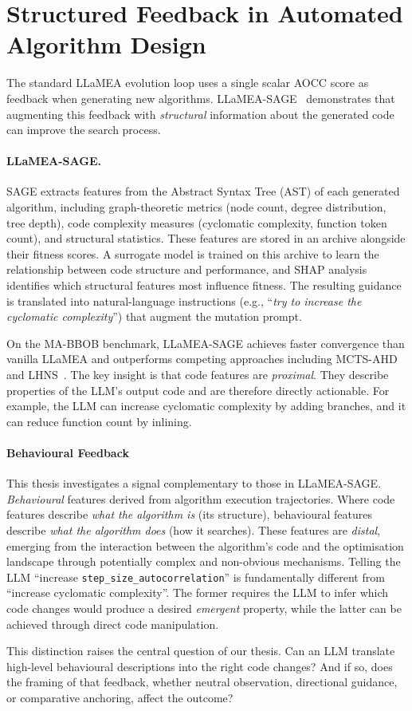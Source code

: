 \section{Structured Feedback in Automated Algorithm Design}
\label{sec:bg-feedback}

The standard LLaMEA evolution loop uses a single scalar AOCC score as feedback when generating new algorithms. LLaMEA-SAGE~\cite{vanStein2026LLaMEASAGE} demonstrates that augmenting this feedback with \emph{structural} information about the generated code can improve the search process.

\paragraph{LLaMEA-SAGE.}
SAGE extracts features from the Abstract Syntax Tree (AST) of each generated algorithm, including graph-theoretic metrics (node count, degree distribution, tree depth), code complexity measures (cyclomatic complexity, function token count), and structural statistics. These features are stored in an archive alongside their fitness scores. A surrogate model is trained on this archive to learn the relationship between code structure and performance, and SHAP analysis~\cite{lundberg2017shap} identifies which structural features most influence fitness. The resulting guidance is translated into natural-language instructions (e.g., ``\textit{try to increase the cyclomatic complexity}'') that augment the mutation prompt.

On the MA-BBOB benchmark, LLaMEA-SAGE achieves faster convergence than vanilla LLaMEA and outperforms competing approaches including MCTS-AHD and LHNS~\cite{vanStein2026LLaMEASAGE}. The key insight is that code features are \emph{proximal}. They describe properties of the LLM's output code and are therefore directly actionable. For example, the LLM can increase cyclomatic complexity by adding branches, and it can reduce function count by inlining.

\paragraph{Behavioural Feedback}
This thesis investigates a signal complementary to those in LLaMEA-SAGE. \emph{Behavioural} features derived from algorithm execution trajectories. Where code features describe \emph{what the algorithm is} (its structure), behavioural features describe \emph{what the algorithm does} (how it searches). These features are \emph{distal}, emerging from the interaction between the algorithm's code and the optimisation landscape through potentially complex and non-obvious mechanisms. Telling the LLM ``increase \texttt{step\_size\_autocorrelation}'' is fundamentally different from ``increase cyclomatic complexity''. The former requires the LLM to infer which code changes would produce a desired \emph{emergent} property, while the latter can be achieved through direct code manipulation.

This distinction raises the central question of our thesis. Can an LLM translate high-level behavioural descriptions into the right code changes? And if so, does the framing of that feedback, whether neutral observation, directional guidance, or comparative anchoring, affect the outcome?

